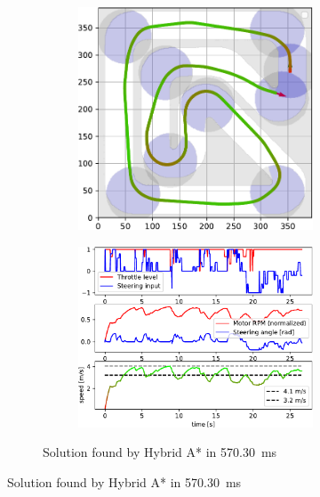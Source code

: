 \begin{figure}[!tbp]%
	\centering
	
	\begin{subfigure}[t]{\textwidth}
		\begin{subfigure}[c]{0.49\textwidth}
			\includegraphics[width=\textwidth]{../img/experiments/race_track_hybrid_astar_trajectory}
		\end{subfigure}
		\hfill
		\begin{subfigure}[c]{0.49\textwidth}
			\includegraphics[width=\textwidth]{../img/experiments/race_track_hybrid_astar_actuators}
		\end{subfigure}	
		\caption{Solution found by Hybrid A* in \SI{570.30}{\milli\second}}
		\label{fig:race_track-hybrid_astar}
	\end{subfigure}
	

\end{figure}
